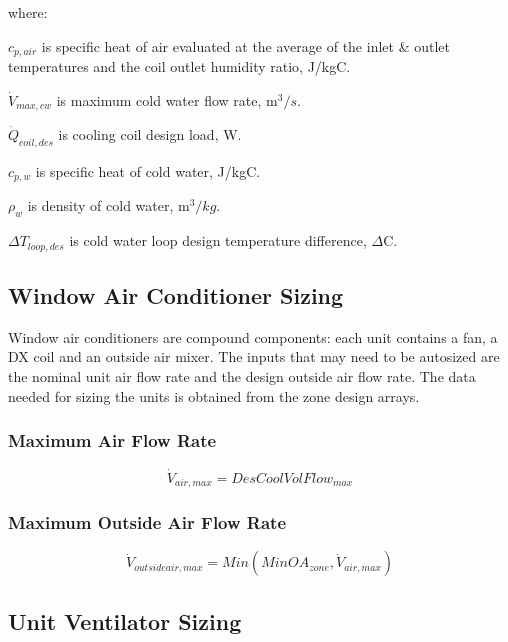 where:

\(c_{p,air}\) is specific heat of air evaluated at the average of the inlet \& outlet temperatures and the coil outlet humidity ratio, J/kgC.

\(\dot{V}_{max,cw}\) is maximum cold water flow rate, m$^{3}/s$.

\(\dot{Q}_{coil,des}\) is cooling coil design load, W.

\(c_{p,w}\) is specific heat of cold water, J/kgC.

\(\rho_{w}\) is density of cold water, m$^{3}/kg$.

\(\Delta T_{loop,des}\) is cold water loop design temperature difference, \(\Delta\)C.

\subsection{Window Air Conditioner Sizing}\label{window-air-conditioner-sizing}

Window air conditioners are compound components: each unit contains a fan, a DX coil and an outside air mixer. The inputs that may need to be autosized are the nominal unit air flow rate and the design outside air flow rate. The data needed for sizing the units is obtained from the zone design arrays.

\subsubsection{Maximum Air Flow Rate}\label{maximum-air-flow-rate-1}

\begin{equation}
{\dot V_{air,max}} = DesCoolVolFlo{w_{max}}
\end{equation}

\subsubsection{Maximum Outside Air Flow Rate}\label{maximum-outside-air-flow-rate-1}

\begin{equation}
\dot V_{outsideair,max} = Min(MinOA_{zone},\dot V_{air,max})
\end{equation}

\subsection{Unit Ventilator Sizing}\label{unit-ventilator-sizing}


